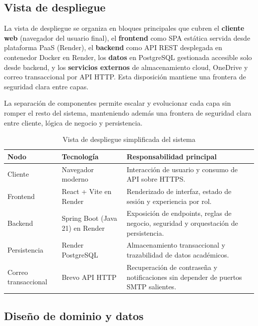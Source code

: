 \subsection{Vista de despliegue}

La vista de despliegue se organiza en bloques principales que cubren el \textbf{cliente web} (navegador del usuario final), el \textbf{frontend} como SPA est\'atica servida desde plataforma PaaS (Render), el \textbf{backend} como API REST desplegada en contenedor Docker en Render, los \textbf{datos} en PostgreSQL gestionada accesible solo desde backend, y los \textbf{servicios externos} de almacenamiento cloud, OneDrive y correo transaccional por API HTTP. Esta disposici\'on mantiene una frontera de seguridad clara entre capas.

La separaci\'on de componentes permite escalar y evolucionar cada capa
sin romper el resto del sistema,
manteniendo adem\'as una frontera de seguridad clara entre cliente,
l\'ogica de negocio y persistencia.

\begin{table}[!htbp]
\centering
\begin{tabular}{|P{2.9cm}|P{3.1cm}|P{5.6cm}|}
\hline
\textbf{Nodo} & \textbf{Tecnolog\'ia} & \textbf{Responsabilidad principal} \\
\hline
Cliente & Navegador moderno & Interacci\'on de usuario y consumo de API sobre HTTPS. \\
\hline
Frontend & React + Vite en Render & Renderizado de interfaz, estado de sesi\'on y experiencia por rol. \\
\hline
Backend & Spring Boot (Java 21) en Render & Exposici\'on de endpoints, reglas de negocio, seguridad y orquestaci\'on de persistencia. \\
\hline
Persistencia & Render PostgreSQL & Almacenamiento transaccional y trazabilidad de datos acad\'emicos. \\
\hline
Correo transaccional & Brevo API HTTP & Recuperaci\'on de contrase\~na y notificaciones sin depender de puertos SMTP salientes. \\
\hline
\end{tabular}
\caption{Vista de despliegue simplificada del sistema}
\label{tab:vista-despliegue}
\end{table}

\subsection{Dise\~no de dominio y datos}

